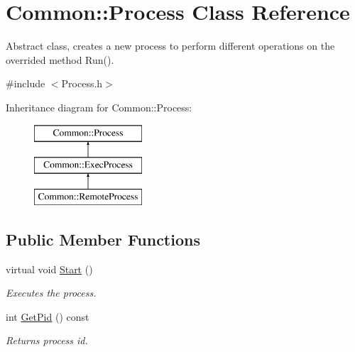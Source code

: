 \hypertarget{class_common_1_1_process}{\section{Common\-:\-:Process Class Reference}
\label{class_common_1_1_process}
}


Abstract class, creates a new process to perform different operations on the overrided method Run().  




{\ttfamily \#include $<$Process.\-h$>$}

Inheritance diagram for Common\-:\-:Process\-:\begin{figure}[H]
\begin{center}
\leavevmode
\includegraphics[height=3.000000cm]{class_common_1_1_process}
\end{center}
\end{figure}
\subsection*{Public Member Functions}
\begin{DoxyCompactItemize}
\item 
\hypertarget{class_common_1_1_process_ae92f973fc379f7020f29d08288685c33}{virtual void \hyperlink{class_common_1_1_process_ae92f973fc379f7020f29d08288685c33}{Start} ()}\label{class_common_1_1_process_ae92f973fc379f7020f29d08288685c33}

\begin{DoxyCompactList}\small\item\em Executes the process. \end{DoxyCompactList}\item 
\hypertarget{class_common_1_1_process_a6e99fb060fb742c7779255cff25dbf97}{int \hyperlink{class_common_1_1_process_a6e99fb060fb742c7779255cff25dbf97}{Get\-Pid} () const }\label{class_common_1_1_process_a6e99fb060fb742c7779255cff25dbf97}

\begin{DoxyCompactList}\small\item\em Returns process id. \end{DoxyCompactList}\end{DoxyCompactItemize}
